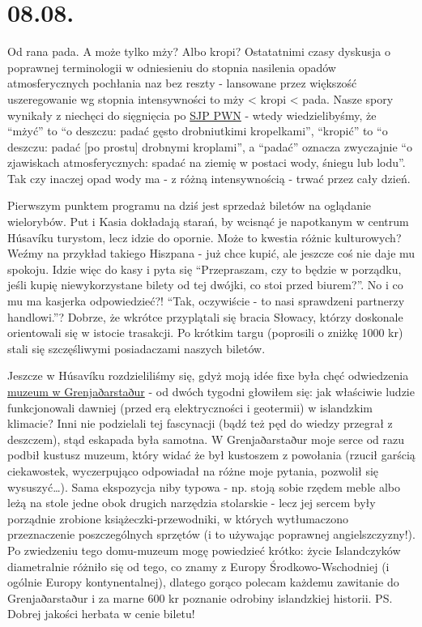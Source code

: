 \chapter*{08.08.}

Od rana pada. A może tylko mży? Albo kropi? Ostatatnimi czasy dyskusja o poprawnej terminologii w odniesieniu do stopnia nasilenia opadów atmosferycznych pochłania naz bez reszty - lansowane przez większość uszeregowanie wg stopnia intensywności to mży < kropi < pada. Nasze spory wynikały z niechęci do sięgnięcia po \href{http://sjp.pwn.pl/}{SJP PWN} - wtedy wiedzielibyśmy, że “mżyć” to “o deszczu: padać gęsto drobniutkimi kropelkami”, “kropić” to “o deszczu: padać [po prostu] drobnymi kroplami”, a “padać” oznacza zwyczajnie “o zjawiskach atmosferycznych: spadać na ziemię w postaci wody, śniegu lub lodu”. Tak czy inaczej opad wody ma - z różną intensywnością - trwać przez cały dzień.

Pierwszym punktem programu na dziś jest sprzedaż biletów na oglądanie wielorybów. Put i Kasia dokładają starań, by wcisnąć je napotkanym w centrum Húsavíku turystom, lecz idzie do opornie. Może to kwestia różnic kulturowych? Weźmy na przykład takiego Hiszpana - już chce kupić, ale jeszcze coś nie daje mu spokoju. Idzie więc do kasy i pyta się “Przepraszam, czy to będzie w porządku, jeśli kupię niewykorzystane bilety od tej dwójki, co stoi przed biurem?”. No i co mu ma kasjerka odpowiedzieć?! “Tak, oczywiście - to nasi sprawdzeni partnerzy handlowi.”? Dobrze, że wkrótce przyplątali się bracia Słowacy, którzy doskonale orientowali się w istocie trasakcji. Po krótkim targu (poprosili o zniżkę 1000 kr) stali się szczęśliwymi posiadaczami naszych biletów.


Jeszcze w Húsavíku rozdzieliliśmy się, gdyż moją idée fixe była chęć odwiedzenia \href{http://www.visithusavik.com/attractions/the-turf-house-museum/}{muzeum w Grenjaðarstaður} - od dwóch tygodni głowiłem się: jak właściwie ludzie funkcjonowali dawniej (przed erą elektryczności i geotermii) w islandzkim klimacie? Inni nie podzielali tej fascynacji (bądź też pęd do wiedzy przegrał z deszczem), stąd eskapada była samotna. W Grenjaðarstaður moje serce od razu podbił kustusz muzeum, który widać że był kustoszem z powołania (rzucił garścią ciekawostek, wyczerpująco odpowiadał na różne moje pytania, pozwolił się wysuszyć…). Sama ekspozycja niby typowa - np. stoją sobie rzędem meble albo leżą na stole jedne obok drugich narzędzia stolarskie - lecz jej sercem były porządnie zrobione książeczki-przewodniki, w których wytłumaczono przeznaczenie poszczególnych sprzętów (i to używając poprawnej angielszczyzny!). Po zwiedzeniu tego domu-muzeum mogę powiedzieć krótko: życie Islandczyków diametralnie różniło się od tego, co znamy z Europy Środkowo-Wschodniej (i ogólnie Europy kontynentalnej), dlatego gorąco polecam każdemu zawitanie do Grenjaðarstaður i za marne 600 kr poznanie odrobiny islandzkiej historii. PS. Dobrej jakości herbata w cenie biletu!


